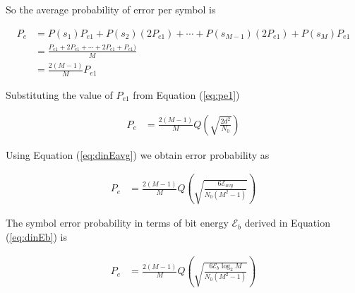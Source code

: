 \documentclass[a4paper]{article}
\numberwithin{equation}{subsection}
\begin{document}
	So the average probability of error per symbol is
	
	\begin{equation}\label{key}
	\begin{aligned}
	P_e 
	&= P(s_1) P_{e1}+P(s_2) (2P_{e1})+\cdots+P(s_{M-1}) (2P_{e1})+P(s_M) P_{e1} \\
	&= \frac{ P_{e1}+ 2P_{e1}+\cdots+ 2P_{e1}+ P_{e1})}{M} \\
	&=\frac{2(M-1)}{M}P_{e1}
	\end{aligned}
	\end{equation}
	
	Substituting the value of $P_{e1}$ from Equation (\ref{eq:pe1})
	
	\begin{equation}\label{key}
	\begin{aligned}
	P_e 
	&=\frac{2(M-1)}{M} Q\left(\sqrt{\frac{2d^2}{N_0}}\right)
	\end{aligned}
	\end{equation}
	
	Using Equation (\ref{eq:dinEavg}) we obtain error probability as 
	
	\begin{equation}\label{key}
	\begin{aligned}
	P_e 
	&=\frac{2(M-1)}{M} Q\left(\sqrt{\frac{6\mathcal{E}_{avg}}{N_0(M^2-1)}}\right)
	\end{aligned}
	\end{equation}
	
	The symbol error probability in terms of bit energy 
	$\mathcal{E}_{b}$ derived in Equation (\ref{eq:dinEb}) is
	
	\begin{equation}\label{key}
	\begin{aligned}
	P_e 
	&=\frac{2(M-1)}{M} Q\left(\sqrt{\frac{6\mathcal{E}_{b}\log_2 M}{N_0(M^2-1)}}\right)
	\end{aligned}
	\end{equation}
	
\end{document}
